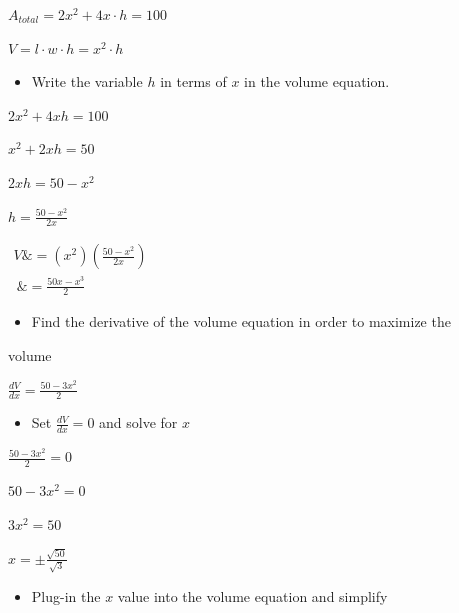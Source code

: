 $A_{total}=2x^2+4x\cdot h=100$



$V=l\cdot w\cdot h=x^2\cdot h$



\begin{itemize}
    \item Write the variable $h$ in terms of $x$ in the volume equation.
\end{itemize}

$2x^2+4xh=100$



$x^2+2xh=50$



$2xh=50-x^2$



$h=\frac{50-x^{2}}{2x}$



$\begin{aligned}

 V \&=\left(x^{2}\right)\left(\frac{50-x^2}{2x}\right) \\\ \&=\frac{50x-x^3}{2}

\end{aligned}$



\begin{itemize}
    \item Find the derivative of the volume equation in order to maximize the
\end{itemize}
    volume



$\frac{dV}{dx}=\frac{50-3x^2}{2}$



\begin{itemize}
    \item Set $\frac{dV}{dx}=0$ and solve for $x$
\end{itemize}

$\frac{50-3x^2}{2}=0$



$50-3x^2=0$



$3x^2=50$



$x=\pm\frac{\sqrt{50}}{\sqrt3}$



\begin{itemize}
    \item Plug-in the $x$ value into the volume equation and simplify
\end{itemize}

